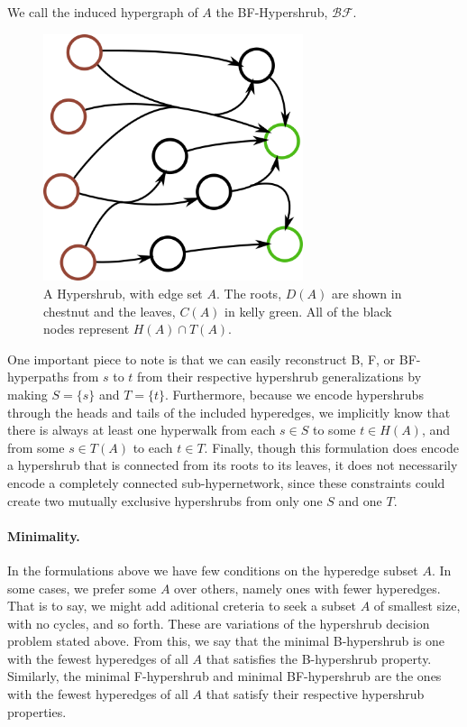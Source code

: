\documentclass[12pt,twoside]{reedthesis}
\theoremstyle{definition}
\begin{document}
We call the induced hypergraph of $A$ the BF-Hypershrub, $\mathcal{BF}$.\par

\begin{figure}[!h]
  \begin{center}
    \includegraphics[width=3in]{BF-hypershrub}
  \caption[Hypershrub.]{A Hypershrub, with edge set $A$. The roots, $D(A)$ are shown in chestnut and the leaves, $C(A)$ in kelly green. All of the black nodes represent $H(A) \cap T(A)$.}
  \label{fig:BF-hypershrub}
  \end{center}
\end{figure}

One important piece to note is that we can easily reconstruct B, F, or BF-hyperpaths from $s$ to $t$ from their respective hypershrub generalizations by making $S=\{s\}$ and $T=\{t\}$. Furthermore, because we encode hypershrubs through the heads and tails of the included hyperedges, we implicitly know that there is always at least one hyperwalk from each $s \in S$ to some $t \in H(A)$, and from some $s \in T(A)$ to each $t \in T$. Finally, though this formulation does encode a hypershrub that is connected from its roots to its leaves, it does not necessarily encode a completely connected sub-hypernetwork, since these constraints could create two mutually exclusive hypershrubs from only one $S$ and one $T$.

\paragraph{Minimality.}In the formulations above we have few conditions on the hyperedge subset $A$. In some cases, we prefer some $A$ over others, namely ones with fewer hyperedges. That is to say, we might add aditional creteria to seek a subset $A$ of smallest size, with no cycles, and so forth. These are variations of the hypershrub decision problem stated above. From this, we say that the minimal B-hypershrub is one with the fewest hyperedges of all $A$ that satisfies the B-hypershrub property. Similarly, the minimal F-hypershrub and minimal BF-hypershrub are the ones with the fewest hyperedges of all $A$ that satisfy their respective hypershrub properties.\par
\end{document}
